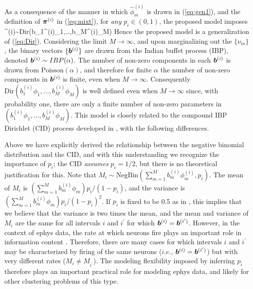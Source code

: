 \documentclass[journal]{IEEEtran}
\begin{document}
As a consequence of the manner in which $\hat{\phi}_m^{(i)}$ is drawn in (\ref{eq:gen1}), and the definition of $\boldsymbol{\pi}^{(i)}$ in (\ref{eq:mixt}), for \emph{any} $p_i\in(0,1)$, the proposed model imposes
\beq \piv^{(i)}\sim\mbox{Dir}(b_1^{(i)}{\phi}_1,\dots,b_M^{(i)}{\phi}_M)\eeq
Hence the proposed model is a generalization of (\ref{eq:Dir}). Considering the limit $M\rightarrow\infty$, and upon marginalizing out the $\{\nu_m\}$, the binary vectors $\{\boldsymbol{b}^{(i)}\}$ are drawn from the Indian buffet process (IBP), denoted $\boldsymbol{b}^{(i)}\sim\relax{IBP}(\alpha)$. The number of non-zero components in each $\boldsymbol{b}^{(i)}$ is drawn from $\mbox{Poisson}(\alpha)$, and therefore for finite $\alpha$ the number of non-zero components in $\boldsymbol{b}^{(i)}$ is finite, even when $M\rightarrow\infty$. Consequently $\mbox{Dir}(b_1^{(i)}{\phi}_1,\dots,b_M^{(i)}{\phi}_M)$ is well defined even when $M\rightarrow\infty$ since, with probability one, there are only a finite number of non-zero parameters in $(b_1^{(i)}{\phi}_1,\dots,b_M^{(i)}{\phi}_M)$. This model is closely related to the compound IBP Dirichlet (CID) process developed in \cite{compound}, with the following differences.

Above we have explicitly derived the relationship between the negative binomial distribution and the CID, and with this understanding we recognize the importance of $p_i$; the CID \emph{assumes} $p_i=1/2$, but there is no theoretical justification for this. Note that  $M_i\sim\mbox{NegBin}(\sum_{m=1}^M b_m^{(i)}{\phi}_m^{(i)},p_i)$. The mean of $M_i$ is $(\sum_{m=1}^M b_m^{(i)}{\phi}_m) p_i/(1-p_i)$, and the variance is $(\sum_{m=1}^M b_m^{(i)}{\phi}_m)p_i/(1-p_i)^2$. If $p_i$ is fixed to be  0.5 as in \cite{compound}, this implies that we believe that the variance is two times the mean, and the mean and variance of $M_i$ are the same for all intervals $i$ and $i^\prime$ for which $\boldsymbol{b}^{(i)}=\boldsymbol{b}^{(i^\prime)}$. However, in the context of ephys data, the rate at which neurons fire plays an important role in information content \cite{Donoghue07}. Therefore, there are many cases for which intervals $i$ and $i^\prime$ may be characterized by firing of the same neurons ($i.e.$, $\boldsymbol{b}^{(i)}=\boldsymbol{b}^{(i^\prime)}$) but with very different rates ($M_i\neq M_{i^\prime}$). The modeling flexibility imposed by inferring $p_i$ therefore plays an important practical role for modeling ephys data, and likely for other clustering problems of this type.
\end{document}
